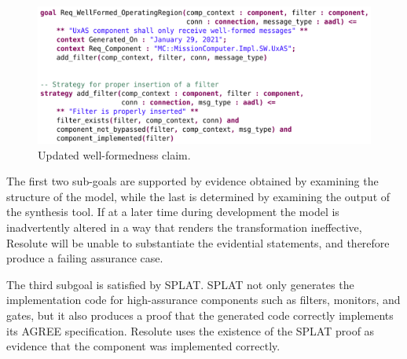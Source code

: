 \begin{figure}[h]
	\centering
	\includegraphics[width=1\columnwidth]{figs/resolute-add-filter.png}
	\caption{Updated well-formedness claim.} 
	\label{fig:resolute-add-filter} 
\end{figure}

The first two sub-goals are supported by evidence obtained by examining the structure of the model, while the last is determined by examining the output of the synthesis tool.  
If at a later time during development the model is inadvertently altered in a way that renders the transformation ineffective, Resolute will be unable to substantiate the evidential statements, and therefore produce a failing assurance case.

The third subgoal is satisfied by SPLAT.  SPLAT not only generates the implementation code for high-assurance components such as filters, monitors, and gates, but it also produces a proof that the generated code correctly implements its AGREE specification.  
Resolute uses the existence of the SPLAT proof as evidence that the component was implemented correctly.





